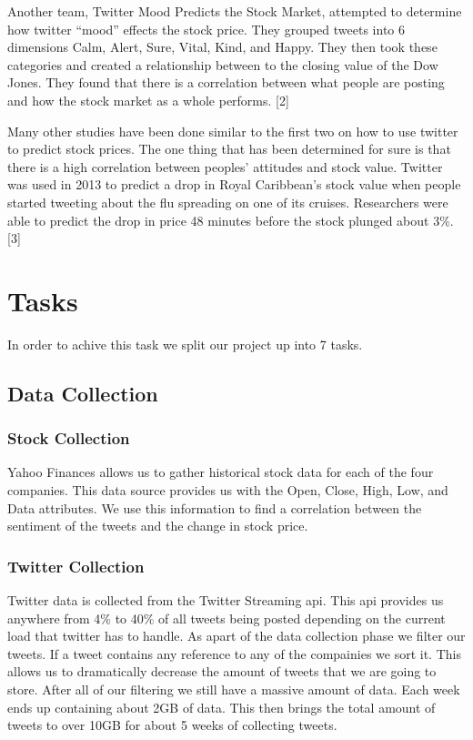 \documentclass{acm_proc_article-sp}
\begin{document}
Another team, Twitter Mood Predicts the Stock Market, attempted to determine
how twitter “mood” effects the stock price. They grouped tweets into 6
dimensions Calm, Alert, Sure, Vital, Kind, and Happy. They then took these
categories and created a relationship between to the closing value of the Dow
Jones. They found that there is a correlation between what people are posting
and how the stock market as a whole performs. [2] 

Many other studies have been done similar to the first two on how to use
twitter to predict stock prices. The one thing that has been determined for
sure is that there is a high correlation between peoples' attitudes and stock
value. Twitter was used in 2013 to predict a drop in Royal Caribbean's stock
value when people started tweeting about the flu spreading on one of its
cruises. Researchers were able to predict the drop in price 48 minutes before
the stock plunged about 3\%.[3]

\section{Tasks}
In order to achive this task we split our project up into 7 tasks.

\subsection{Data Collection} 
\subsubsection{Stock Collection} 

Yahoo Finances allows us to gather historical stock data for each of the four
companies.  This data source provides us with the Open, Close, High, Low, and
Data attributes. We use this information to find a correlation between the
sentiment of the tweets and the change in stock price.

\subsubsection{Twitter Collection} 

Twitter data is collected from the Twitter Streaming api. This api provides us
anywhere from 4\% to 40\% of all tweets being posted depending on the current
load that twitter has to handle. As apart of the data collection phase we
filter our tweets. If a tweet contains any reference to any of the compainies
we sort it. This allows us to dramatically decrease the amount of tweets that
we are going to store. After all of our filtering we still have a massive
amount of data. Each week ends up containing about 2GB of data. This then
brings the total amount of tweets to over 10GB for about 5 weeks of collecting
tweets. 
\end{document}
